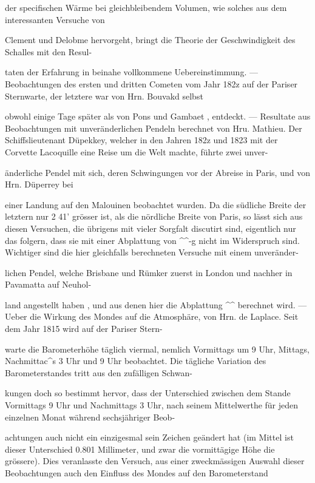 \documentclass[10pt,a4paper]{article}
\begin{document}
der specifischen Wärme bei gleichbleibendem Volumen, wie solches aus dem interessanten Versuche von

Clement und Delobme hervorgeht, bringt die Theorie der Geschwindigkeit des Schalles mit den Resul-

taten der Erfahrung in beinahe vollkommene Uebereinstimmung. — Beobachtungen des ersten und dritten Cometen vom Jahr 182z auf der Pariser Sternwarte, der letztere war von Hrn. Bouvakd selbst

obwohl einige Tage später als von Pons und Gambaet , entdeckt. — Resultate aus Beobachtungen mit unveränderlichen Pendeln berechnet von Hru. Mathieu. Der Schiffslieutenant Düpekkey, welcher in den Jahren 182z und 1823 mit der Corvette Lacoquille eine Reise um die Welt machte, führte zwei unver-

änderliche Pendel mit sich, deren Schwingungen vor der Abreise in Paris, und von Hrn. Düperrey bei

einer Landung auf den Malouinen beobachtet wurden. Da die südliche Breite der letztern nur 2\textdegree{} 41' grösser ist, als die nördliche Breite von Paris, so lässt sich aus diesen Versuchen, die übrigens mit vieler Sorgfalt discutirt sind, eigentlich nur das folgern, dass sie mit einer Abplattung von \textasciicircum{}\textasciicircum{}-g nicht im Widerspruch sind. Wichtiger sind die hier gleichfalls berechneten Versuche mit einem unveränder-

lichen Pendel, welche Brisbane und Rümker zuerst in London und nachher in Pavamatta auf Neuhol-

land angestellt haben , und aus denen hier die Abplattung \textasciicircum{}\textasciicircum{} berechnet wird. — Ueber die Wirkung des Mondes auf die Atmosphäre, von Hrn. de Laplace. Seit dem Jahr 1815 wird auf der Pariser Stern-

warte die Barometerhöhe täglich viermal, nemlich Vormittags um 9 Uhr, Mittags, Nachmittac\textasciicircum{}s 3 Uhr und 9 Uhr beobachtet. Die tägliche Variation des Barometerstandes tritt aus den zufälligen Schwan-

kungen doch so bestimmt hervor, dass der Unterschied zwischen dem Stande Vormittags 9 Uhr und Nachmittags 3 Uhr, nach seinem Mittelwerthe für jeden einzelnen Monat während sechsjähriger Beob-

achtungen auch nicht ein einzigesmal sein Zeichen geändert hat (im Mittel ist dieser Unterschied 0.801 Millimeter, und zwar die vormittägige Höhe die grössere). Dies veranlasste den Versuch, aus einer zweckmässigen Auswahl dieser Beobachtungen auch den Einfluss des Mondes auf den Barometerstand
\end{document}
